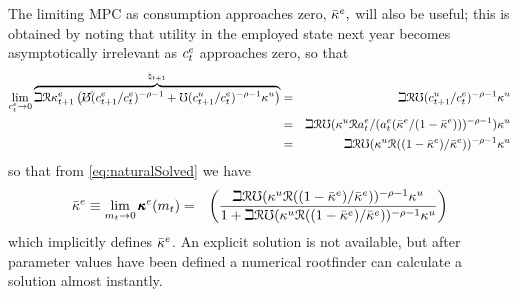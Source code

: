 \message{ !name(TractableBufferStock.tex)}\documentclass{handout}
\begin{document}
The limiting MPC as consumption approaches zero, $\bar{\kappa}^{e},$ will also be useful; this is obtained
by noting that utility in the employed state next year becomes asymptotically irrelevant as $c^{e}_{t}$ approaches zero, so that 
\begin{eqnarray*}
  \lim_{c^{e}_{t} \rightarrow 0}  \overbrace{ \beth \mathcal{R} \kappa^{e}_{t+1} \left(\cancel{\mho} (c^{e}_{t+1}/c^{e}_{t})^{-\rho-1}  + \mho (c^{u}_{t+1}/c^{e}_{t})^{-\rho-1}\kappa^{u}\right)}^{\natural_{t+1}} & = & \beth \mathcal{R} \mho (c^{u}_{t+1}/c^{e}_{t})^{-\rho-1}\kappa^{u}
\\  & = & \beth \mathcal{R} \mho (\kappa^{u} \mathcal{R} a^{e}_{t}/(a^{e}_{t}(\bar{\kappa}^{e}/(1-\bar{\kappa}^{e})))^{-\rho-1})\kappa^{u}
\\ & = & \beth \mathcal{R} \mho (\kappa^{u} \mathcal{R} ((1-\bar{\kappa}^{e})/\bar{\kappa}^{e}))^{-\rho-1}\kappa^{u}
\end{eqnarray*}
so that from \eqref{eq:naturalSolved} we have 
\begin{eqnarray}
  \bar{\kappa}^{e} \equiv \lim_{m_{t} \rightarrow 0} \pmb{\kappa}^{e}(m_{t}) & = & \left(\frac{
\beth \mathcal{R} \mho (\kappa^{u} \mathcal{R} ((1-\bar{\kappa}^{e})/\bar{\kappa}^{e}))^{-\rho-1}\kappa^{u}
}{1+
\beth \mathcal{R} \mho (\kappa^{u} \mathcal{R} ((1-\bar{\kappa}^{e})/\bar{\kappa}^{e}))^{-\rho-1}\kappa^{u}
}\right) \label{eq:MPCat0}
\end{eqnarray}
which implicitly defines $\bar{\kappa}^{e}$.  An explicit solution is not available, but after 
parameter values have been defined a numerical rootfinder can calculate a solution almost instantly. 
\end{document}
